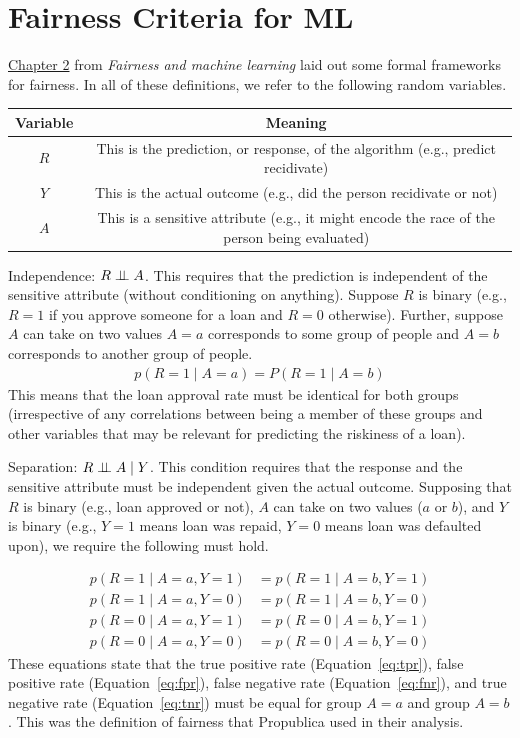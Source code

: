 \documentclass[review_Solutions]{subfiles}
\begin{document}
\section{Fairness Criteria for ML}

\href{https://fairmlbook.org/classification.html}{Chapter 2} from \emph{Fairness and machine learning} laid out some formal frameworks for fairness.  In all of these definitions, we refer to the following random variables.

\vspace{1em}
\begin{tabular}{c | c}
\textbf{Variable} & \textbf{Meaning} \\
\hline
$R$ & This is the prediction, or response, of the algorithm (e.g., predict recidivate) \\
$Y$ & This is the actual outcome (e.g., did the person recidivate or not) \\
$A$ & This is a sensitive attribute (e.g., it might encode the race of the person being evaluated)
\end{tabular}


\bi
\item Independence: $R \perp\!\!\!\perp A$.  This requires that the prediction is independent of the sensitive attribute (without conditioning on anything).  Suppose $R$ is binary (e.g., $R=1$ if you approve someone for a loan and $R=0$ otherwise).  Further, suppose $A$ can take on two values $A=a$ corresponds to some group of people and $A=b$ corresponds to another group of people.
\begin{align}
p(R=1\mid A=a) = P(R=1 \mid A=b)
\end{align}
This means that the loan approval rate must be identical for both groups (irrespective of any correlations between being a member of these groups and other variables that may be relevant for predicting the riskiness of a loan).

\item Separation: $R \perp\!\!\!\perp A \mid Y$.  This condition requires that the response and the sensitive attribute must be independent given the actual outcome.  Supposing that $R$ is binary (e.g., loan approved or not), $A$ can take on two values ($a$ or $b$), and $Y$ is binary (e.g., $Y=1$ means loan was repaid, $Y=0$ means loan was defaulted upon), we require the following must hold.

\begin{align}
p(R=1 \mid A=a, Y=1) &= p(R=1 \mid A=b, Y=1) \label{eq:tpr} \\
p(R=1 \mid A=a, Y=0) &= p(R=1 \mid A=b, Y=0) \label{eq:fpr} \\
p(R=0 \mid A=a, Y=1) &= p(R=0 \mid A=b, Y=1) \label{eq:fnr} \\
p(R=0 \mid A=a, Y=0) &= p(R=0 \mid A=b, Y=0) \label{eq:tnr}
\end{align}
These equations state that the true positive rate (Equation~\ref{eq:tpr}), false positive rate (Equation~\ref{eq:fpr}), false negative rate (Equation~\ref{eq:fnr}), and true negative rate (Equation~\ref{eq:tnr}) must be equal for group $A=a$ and group $A=b$.  This was the definition of fairness that Propublica used in their analysis.
\end{document}
